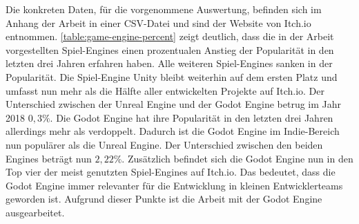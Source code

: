 Die konkreten Daten, für die vorgenommene Auswertung, befinden sich im Anhang der Arbeit in einer \ac{CSV}-Datei und sind der Website von Itch.io entnommen\cite{most-projects}.
\autoref{table:game-engine-percent} zeigt deutlich, dass die in der Arbeit vorgestellten Spiel-Engines einen prozentualen Anstieg der Popularität in den letzten drei Jahren erfahren haben. Alle weiteren Spiel-Engines sanken in der Popularität. Die Spiel-Engine Unity bleibt weiterhin auf dem ersten Platz und umfasst nun mehr als die Hälfte aller entwickelten Projekte auf Itch.io. Der Unterschied zwischen der Unreal Engine und der Godot Engine betrug im Jahr 2018 $0{,}3\%$. Die Godot Engine hat ihre Popularität in den letzten drei Jahren allerdings mehr als verdoppelt. Dadurch ist die Godot Engine im Indie-Bereich nun populärer als die Unreal Engine. Der Unterschied zwischen den beiden Engines beträgt nun $2{,}22\%$. Zusätzlich befindet sich die Godot Engine nun in den Top vier der meist genutzten Spiel-Engines auf Itch.io. Das bedeutet, dass die Godot Engine immer relevanter für die Entwicklung in kleinen Entwicklerteams geworden ist. Aufgrund dieser Punkte ist die Arbeit mit der Godot Engine ausgearbeitet. \\ 

